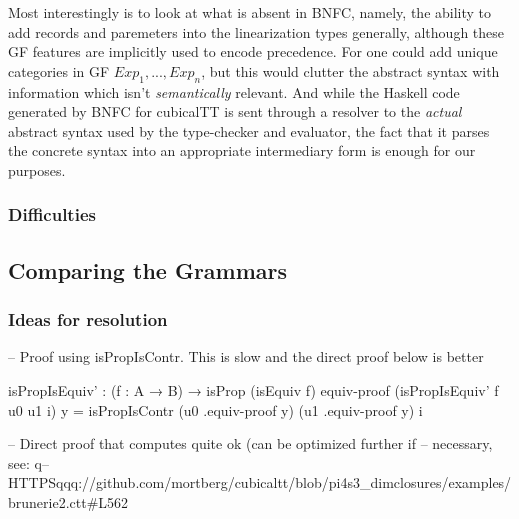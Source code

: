 Most interestingly is to look at what is
absent in BNFC, namely, the ability to add records and paremeters into the
linearization types generally, although these GF features are implicitly used to
encode precedence. For one could add unique categories in GF $Exp_1,...,Exp_n$, but this would
clutter the abstract syntax with information which isn't \emph{semantically}
relevant. And while the Haskell code generated by BNFC for cubicalTT is sent through a
resolver to the \emph{actual} abstract syntax used by the type-checker and
evaluator, the fact that it parses the concrete syntax into an appropriate
intermediary form is enough for our purposes. 

\subsubsection{Difficulties}

\subsection{Comparing the Grammars}

\subsubsection{Ideas for resolution}



-- Proof using isPropIsContr. This is slow and the direct proof below is better

isPropIsEquiv' : (f : A → B) → isProp (isEquiv f)
equiv-proof (isPropIsEquiv' f u0 u1 i) y =
  isPropIsContr (u0 .equiv-proof y) (u1 .equiv-proof y) i

-- Direct proof that computes quite ok (can be optimized further if
-- necessary, see:
q-- HTTPSqqq://github.com/mortberg/cubicaltt/blob/pi4s3_dimclosures/examples/brunerie2.ctt#L562









